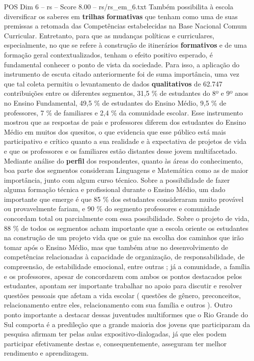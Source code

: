 \begin{textsample}{POS Dim 6 – rs – Score 8.00 – rs/rs\_em\_6.txt}
Também possibilita à escola diversificar os saberes em \textbf{trilhas} \textbf{formativas} que tenham como uma de suas premissas a retomada das Competências estabelecidas na Base Nacional Comum Curricular.
Entretanto, para que as mudanças políticas e curriculares, especialmente, no que se refere à construção de itinerários \textbf{formativos} e de uma formação geral contextualizados, tenham o efeito positivo esperado, é fundamental conhecer o ponto de vista da sociedade.
Para isso, a aplicação do instrumento de escuta citado anteriormente foi de suma importância, uma vez que tal coleta permitiu o levantamento de dados \textbf{qualitativos} de 62.747 contribuições entre os diferentes segmentos, 31,5 \% de estudantes do 8º e 9º anos no Ensino Fundamental, 49,5 \% de estudantes do Ensino Médio, 9,5 \% de professores, 7 \% de familiares e 2,4 \% da comunidade escolar.
Esse instrumento mostrou que as respostas de pais e professores diferem dos estudantes do Ensino Médio em muitos dos quesitos, o que evidencia que esse público está mais participativo e crítico quanto a sua realidade e à expectativa de projetos de vida e que os professores e os familiares estão distantes desse jovem multifacetado.
Mediante análise do \textbf{perfil} dos respondentes, quanto às áreas do conhecimento, boa parte dos segmentos consideram Linguagens e Matemática como as de maior importância, junto com algum curso técnico.
Sobre a possibilidade de fazer alguma formação técnica e profissional durante o Ensino Médio, um dado importante que emerge é que 85 \% dos estudantes consideraram muito provável ou provavelmente fariam, e 90 \% do segmento professores e comunidade concordam total ou parcialmente com essa possibilidade.
Sobre o projeto de vida, 88 \% de todos os segmentos acham importante que a escola oriente os estudantes na construção de um projeto vida que os guie na escolha dos caminhos que irão tomar após o Ensino Médio, mas que também atue no desenvolvimento de competências relacionadas à capacidade de organização, de responsabilidade, de compreensão, de estabilidade emocional, entre outras ; já a comunidade, a família e os professores, apesar de concordarem com ambos os pontos destacados pelos estudantes, apontam ser importante trabalhar no apoio para discutir e resolver questões pessoais que afetam a vida escolar ( questões de gênero, preconceitos, relacionamento entre eles, relacionamento com sua família e outros ).
Outro ponto importante a destacar dessas juventudes multiformes que o Rio Grande do Sul comporta é a predileção que a grande maioria dos jovens que participaram da pesquisa afirmam ter pelas aulas expositivo-dialogadas, já que eles podem participar efetivamente destas e, consequentemente, asseguram ter melhor rendimento e aprendizagem.

\end{textsample}
